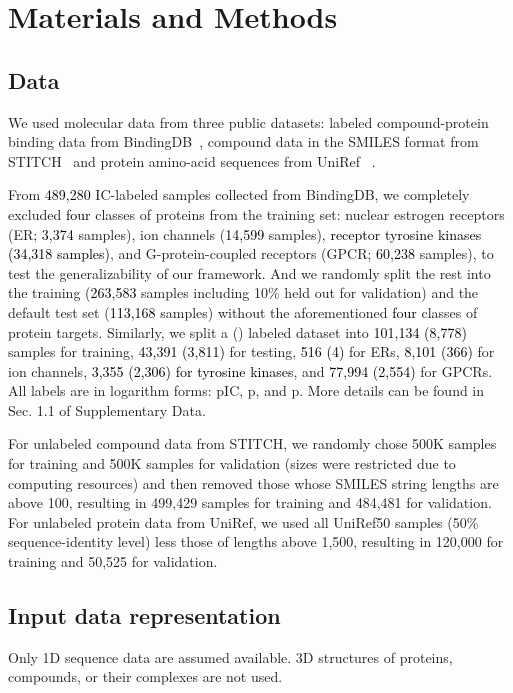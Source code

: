 \documentclass[nocrop]{bioinfo}
\newcommand{\red}[1]{\textcolor{black}{#1}}
\begin{document}
\vspace{-3em}

\section{Materials and Methods}
\subsection{Data}

We used molecular data from three public datasets: labeled compound-protein binding data from BindingDB~\citep{liu2006bindingdb}, compound data in the SMILES format from STITCH~\citep{kuhn2007stitch} and protein amino-acid sequences from UniRef ~\citep{suzek2014uniref}.

From \red{489,280} IC-labeled samples collected from BindingDB, we completely excluded \red{four} classes of proteins from the training set:  nuclear estrogen receptors  (ER;  \red{3,374} samples), ion channels  (\red{14,599} samples), \red{ receptor tyrosine kinases  (34,318 samples)}, and G-protein-coupled receptors  (GPCR; \red{60,238} samples), to test the generalizability of our framework.  And we randomly split the rest into the training  (\red{263,583} samples including 10\% held out for validation) and the default test set  (\red{113,168} samples) without the aforementioned \red{four} classes of protein targets.  Similarly, we split a   () labeled dataset into \red{101,134  (8,778)} samples for training, \red{43,391  (3,811)} for testing, \red{516  (4)} for ERs, \red{8,101  (366)} for ion channels, \red{3,355  (2,306) for tyrosine kinases}, and \red{77,994  (2,554)} for GPCRs. All labels are in logarithm forms: pIC, p, and p.  More details can be found in Sec. 1.1 of Supplementary Data.  
 
For unlabeled compound data from STITCH, we randomly chose 500K samples for training and 500K samples for validation  (sizes were restricted due to computing resources) and then removed those whose SMILES string lengths are above 100, resulting in 499,429 samples for training and 484,481 for validation. For unlabeled protein data from UniRef, we used all UniRef50 samples  (50\% sequence-identity level) less those of  lengths above 1,500, resulting in  120,000 for training and 50,525 for validation.  


 \vspace{-1em}
\subsection{Input data representation}
Only 1D sequence data are assumed available. 3D structures of proteins, compounds, or their complexes are not used.  
\end{document}
